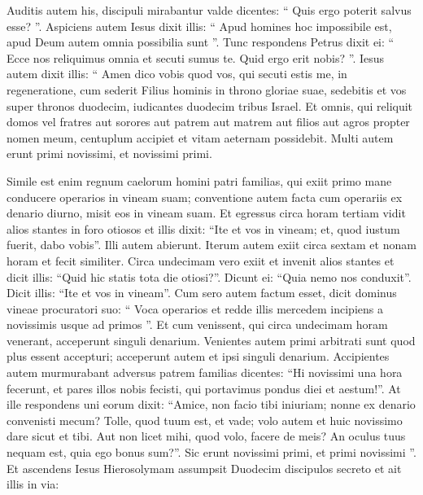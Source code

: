 \begin{biblechapter}
\begin{biblechapter}
\begin{biblechapter}
\begin{biblechapter}
\begin{biblechapter}
\begin{biblechapter}
\begin{biblechapter}
\begin{biblechapter}
\begin{biblechapter}
\begin{biblechapter}
\begin{biblechapter}
\begin{biblechapter}
\begin{biblechapter}
\begin{biblechapter}
\begin{biblechapter}
\begin{biblechapter}
\begin{biblechapter}
\begin{biblechapter}
\begin{biblechapter}
\verse Auditis autem his, discipuli mirabantur valde dicentes: “ Quis ergo poterit salvus esse? ”. 
\verse Aspiciens autem Iesus dixit illis: “ Apud homines hoc impossibile est, apud Deum autem omnia possibilia sunt ”.
 \verse Tunc respondens Petrus dixit ei: “ Ecce nos reliquimus omnia et secuti sumus te. Quid ergo erit nobis? ”. 
\verse Iesus autem dixit illis: “ Amen dico vobis quod vos, qui secuti estis me, in regeneratione, cum sederit Filius hominis in throno gloriae suae, sedebitis et vos super thronos duodecim, iudicantes duodecim tribus Israel. 
\verse Et omnis, qui reliquit domos vel fratres aut sorores aut patrem aut matrem aut filios aut agros propter nomen meum, centuplum accipiet et vitam aeternam possidebit.
 \verse Multi autem erunt primi novissimi, et novissimi primi.
 
\begin{biblechapter}
\verse Simile est enim regnum caelorum homini patri familias, qui exiit primo mane conducere operarios in vineam suam; 
\verse conventione autem facta cum operariis ex denario diurno, misit eos in vineam suam. 
\verse Et egressus circa horam tertiam vidit alios stantes in foro otiosos 
\verse et illis dixit: “Ite et vos in vineam; et, quod iustum fuerit, dabo vobis”. 
\verse Illi autem abierunt. Iterum autem exiit circa sextam et nonam horam et fecit similiter. 
\verse Circa undecimam vero exiit et invenit alios stantes et dicit illis: “Quid hic statis tota die otiosi?”. 
\verse Dicunt ei: “Quia nemo nos conduxit”. Dicit illis: “Ite et vos in vineam”.
 \verse Cum sero autem factum esset, dicit dominus vineae procuratori suo: “ Voca operarios et redde illis mercedem incipiens a novissimis usque ad primos ”. 
 \verse Et cum venissent, qui circa undecimam horam venerant, acceperunt singuli denarium. 
\verse Venientes autem primi arbitrati sunt quod plus essent accepturi; acceperunt autem et ipsi singuli denarium. 
\verse Accipientes autem murmurabant adversus patrem familias 
\verse dicentes: “Hi novissimi una hora fecerunt, et pares illos nobis fecisti, qui portavimus pondus diei et aestum!”. 
 \verse At ille respondens uni eorum dixit: “Amice, non facio tibi iniuriam; nonne ex denario convenisti mecum? 
\verse Tolle, quod tuum est, et vade; volo autem et huic novissimo dare sicut et tibi. 
\verse Aut non licet mihi, quod volo, facere de meis? An oculus tuus nequam est, quia ego bonus sum?”.
 \verse Sic erunt novissimi primi, et primi novissimi ”.
 \verse Et ascendens Iesus Hierosolymam assumpsit Duodecim discipulos secreto et ait illis in via: 

\end{biblechapter}
\end{biblechapter}
\end{biblechapter}
\end{biblechapter}
\end{biblechapter}
\end{biblechapter}
\end{biblechapter}
\end{biblechapter}
\end{biblechapter}
\end{biblechapter}
\end{biblechapter}
\end{biblechapter}
\end{biblechapter}
\end{biblechapter}
\end{biblechapter}
\end{biblechapter}
\end{biblechapter}
\end{biblechapter}
\end{biblechapter}
\end{biblechapter}
